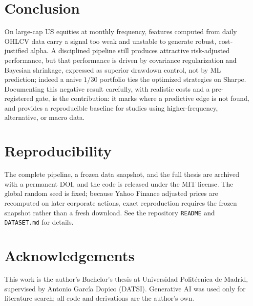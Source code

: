 \documentclass[11pt]{article}
\begin{document}
\section{Conclusion}
On large-cap US equities at monthly frequency, features computed from daily OHLCV data carry a
signal too weak and unstable to generate robust, cost-justified alpha. A disciplined pipeline
still produces attractive risk-adjusted performance, but that performance is driven by covariance
regularization and Bayesian shrinkage, expressed as superior drawdown control, not by ML
prediction; indeed a naive $1/30$ portfolio ties the optimized strategies on Sharpe. Documenting
this negative result carefully, with realistic costs and a pre-registered gate, is the
contribution: it marks where a predictive edge is not found, and provides a reproducible baseline
for studies using higher-frequency, alternative, or macro data.

\section*{Reproducibility}
The complete pipeline, a frozen data snapshot, and the full thesis are archived with a permanent
DOI, and the code is released under the MIT license. The global random seed is fixed; because
Yahoo Finance adjusted prices are recomputed on later corporate actions, exact reproduction
requires the frozen snapshot rather than a fresh download. See the repository \texttt{README} and
\texttt{DATASET.md} for details.

\section*{Acknowledgements}
This work is the author's Bachelor's thesis at Universidad Polit\'ecnica de Madrid, supervised by
Antonio Garc\'ia Dopico (DATSI). Generative AI was used only for literature search; all code and
derivations are the author's own.



\end{document}
